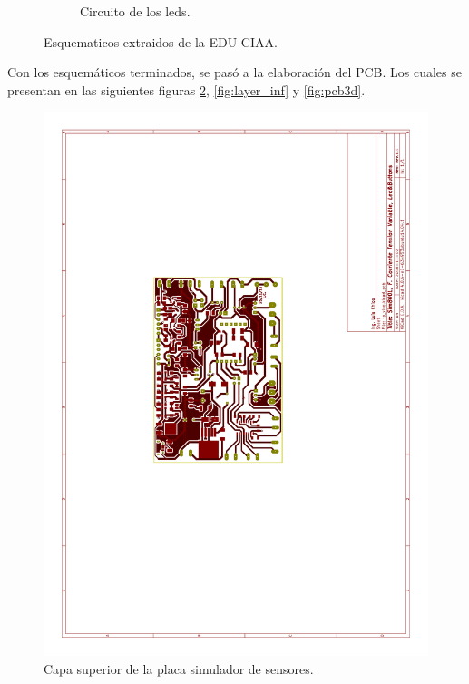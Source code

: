 \begin{figure}[!hp]
\begin{subfigure}{0.4\textwidth}
    \caption{Circuito de los leds.}
  \end{subfigure}
  \caption{Esquematicos extraidos de la EDU-CIAA.}
  \label{fig:pul_leda_pulses}
\end{figure}

Con los esquemáticos terminados, se pasó a la elaboración del PCB. Los cuales se presentan en las siguientes figuras \ref{fig:layer_sup}, \ref{fig:layer_inf} y \ref{fig:pcb3d}.
\begin{figure}[!hp]
  \centering
  \includegraphics[page=1,angle=270,clip,trim=5.5cm 10cm 7.7cm 8.5cm]{./Figures/pcb_layer.pdf}
  \caption{Capa superior de la placa simulador de sensores.}
  \label{fig:layer_sup}
\end{figure}
